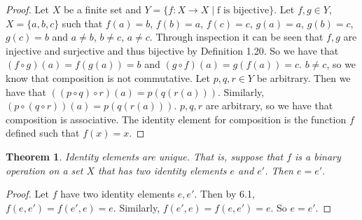 \documentclass[12pt]{article}
\renewcommand{\_}[1]{\underline{ #1 }}
\newtheorem{theorem}{Theorem}[section]
\theoremstyle{definition}
\numberwithin{equation}{subsection}
\begin{document}
\begin{proof}
Let $X$ be a finite set and $Y = \{f : X \to X \mid \text{f is bijective}\}$. Let $f,g \in Y$, $X = \{a,b,c\}$ such that $f(a) = b$, $f(b) = a$, $f(c) = c$, $g(a) = a$, $g(b) = c$, $g(c) = b$ and $a \not = b$, $b \not = c$, $a \not = c$. Through inspection it can be seen that $f,g$ are injective and surjective and thus bijective by Definition 1.20. So we have that $(f \circ g)(a) = f(g(a)) = b$ and $(g \circ f)(a) = g(f(a)) = c$. $b \not = c$, so we know that composition is not commutative. \newline
Let $p,q,r \in Y$ be arbitrary. Then we have that $((p \circ q) \circ r)(a) = p(q(r(a)))$. Similarly, $(p \circ (q \circ r))(a) = p(q(r(a)))$. $p,q,r$ are arbitrary, so we have that composition is associative. \newline
The identity element for composition is the function $f$ defined such that $f(x) = x$.
\end{proof}

\begin{theorem}  Identity elements are unique.  That is, suppose that $f$ is a binary operation on a set $X$ that has two identity elements $e$ and $e'$.  Then $e = e'$.
\end{theorem}

\begin{proof}
Let $f$ have two identity elements $e, e'$. Then by 6.1, $f(e,e') = f(e',e) = e$. Similarly, $f(e',e) = f(e,e') = e$. So $e = e'$.
\end{proof}

\pagebreak
\end{document}
